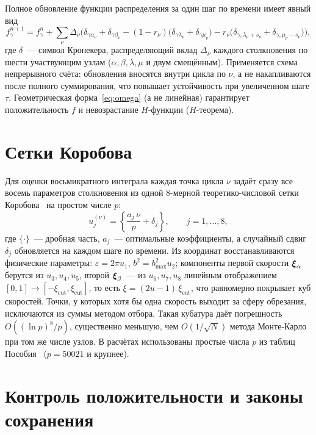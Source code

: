 Полное обновление функции распределения за один шаг по времени имеет явный вид
\begin{equation}
  f_\gamma^{n+1}=f_\gamma^{n}+\sum_{\nu}\Delta_\nu\Big(\delta_{\gamma\alpha_\nu}+\delta_{\gamma\beta_\nu}
  -(1-r_\nu)\big(\delta_{\gamma\lambda_\nu}+\delta_{\gamma\mu_\nu}\big)
  -r_\nu\big(\delta_{\gamma,\lambda_\nu+s_\nu}+\delta_{\gamma,\mu_\nu-s_\nu}\big)\Big),
\end{equation}
где $\delta$~--- символ Кронекера, распределяющий вклад $\Delta_\nu$ каждого столкновения по шести участвующим узлам
($\alpha,\beta,\lambda,\mu$ и двум смещённым).
Применяется схема непрерывного счёта: обновления вносятся внутри цикла по $\nu$, а не накапливаются после полного
суммирования, что повышает устойчивость при увеличенном шаге $\tau$.
Геометрическая форма~\eqref{eq:omega} (а не линейная) гарантирует положительность $f$ и невозрастание $H$-функции
($H$-теорема).

\section{Сетки Коробова}

Для оценки восьмикратного интеграла каждая точка цикла $\nu$ задаёт сразу все восемь параметров столкновения из одной
8-мерной теоретико-числовой сетки Коробова~\cite{Korobov} на простом числе $p$:
\begin{equation}
  u_j^{(\nu)}=\left\{\frac{a_j\,\nu}{p}+\delta_j\right\},\qquad j=1,\dots,8,
\end{equation}
где $\{\cdot\}$~--- дробная часть, $a_j$~--- оптимальные коэффициенты, а случайный сдвиг $\delta_j$ обновляется на
каждом шаге по времени.
Из координат восстанавливаются физические параметры: $\varepsilon=2\pi u_1$, $b^2=b_{\max}^2 u_2$; компоненты первой
скорости $\boldsymbol{\xi}_\alpha$ берутся из $u_3,u_4,u_5$, второй $\boldsymbol{\xi}_\beta$~--- из $u_6,u_7,u_8$ линейным отображением
$[0,1]\to[-\xi_{\mathrm{cut}},\xi_{\mathrm{cut}}]$, то есть $\xi=(2u-1)\,\xi_{\mathrm{cut}}$, что равномерно покрывает
куб скоростей.
Точки, у которых хотя бы одна скорость выходит за сферу обрезания, исключаются из суммы методом отбора.
Такая кубатура даёт погрешность $O\!\left((\ln p)^8/p\right)$, существенно меньшую, чем $O\left(1/\sqrt{N}\right)$
метода Монте-Карло при том же числе узлов.
В расчётах использованы простые числа $p$ из таблиц Пособия~\cite{Tcher} ($p=50021$ и крупнее).

\section{Контроль положительности и законы сохранения}

